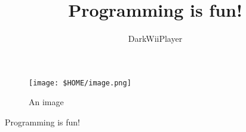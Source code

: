\documentclass{article}
\title{Programming is fun!}
\author{DarkWiiPlayer}
\begin{document}
\maketitle

\begin{figure}[h]
	\centering
	\texttt{[image: \$HOME/image.png]}
	\caption{An image}
	\label{fig:image1}
\end{figure}

Programming is fun! \cite{sicp}



\end{document}
